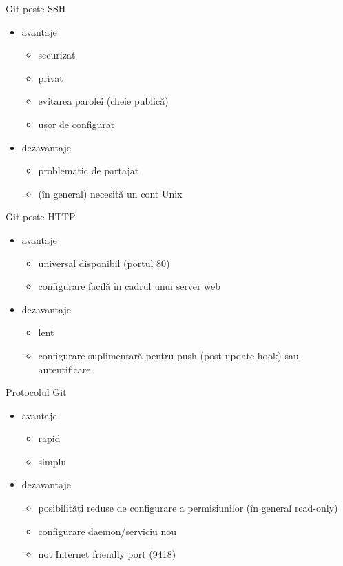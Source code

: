 \documentclass{simple}
\begin{document}
\begin{frame}{Git peste SSH}
	\begin{itemize}
		\item avantaje
          \begin{itemize}
            \item securizat
            \item privat
            \item evitarea parolei (cheie publică)
            \item ușor de configurat
          \end{itemize}
		\item dezavantaje
          \begin{itemize}
            \item problematic de partajat
            \item (în general) necesită un cont Unix
          \end{itemize}
	\end{itemize}
\end{frame}

\begin{frame}{Git peste HTTP}
	\begin{itemize}
		\item avantaje
          \begin{itemize}
            \item universal disponibil (portul 80)
            \item configurare facilă în cadrul unui server web
          \end{itemize}
		\item dezavantaje
          \begin{itemize}
            \item lent
            \item configurare suplimentară pentru push (post-update hook) sau
            autentificare
          \end{itemize}
	\end{itemize}
\end{frame}

\begin{frame}{Protocolul Git}
	\begin{itemize}
		\item avantaje
          \begin{itemize}
            \item rapid
            \item simplu
          \end{itemize}
		\item dezavantaje
          \begin{itemize}
            \item posibilități reduse de configurare a permisiunilor (în
            general read-only)
            \item configurare daemon/serviciu nou
            \item not Internet friendly port (9418)
          \end{itemize}
	\end{itemize}
\end{frame}
\end{document}
